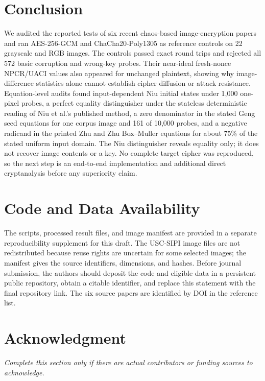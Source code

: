 \documentclass[letterpaper,journal]{IEEEtran}
\begin{document}
\section{Conclusion}
We audited the reported tests of six recent chaos-based image-encryption papers and ran AES-256-GCM and ChaCha20-Poly1305 as reference controls on 22 grayscale and RGB images. The controls passed exact round trips and rejected all 572 basic corruption and wrong-key probes. Their near-ideal fresh-nonce NPCR/UACI values also appeared for unchanged plaintext, showing why image-difference statistics alone cannot establish cipher diffusion or attack resistance. Equation-level audits found input-dependent Niu initial states under 1,000 one-pixel probes, a perfect equality distinguisher under the stateless deterministic reading of Niu et al.'s published method, a zero denominator in the stated Geng seed equations for one corpus image and 161 of 10,000 probes, and a negative radicand in the printed Zhu and Zhu Box--Muller equations for about 75\% of the stated uniform input domain. The Niu distinguisher reveals equality only; it does not recover image contents or a key. No complete target cipher was reproduced, so the next step is an end-to-end implementation and additional direct cryptanalysis before any superiority claim.

\section*{Code and Data Availability}
The scripts, processed result files, and image manifest are provided in a separate reproducibility supplement for this draft. The USC-SIPI image files are not redistributed because reuse rights are uncertain for some selected images; the manifest gives the source identifiers, dimensions, and hashes. Before journal submission, the authors should deposit the code and eligible data in a persistent public repository, obtain a citable identifier, and replace this statement with the final repository link. The six source papers are identified by DOI in the reference list.

\section*{Acknowledgment}
\textit{Complete this section only if there are actual contributors or funding sources to acknowledge.}



\end{document}

